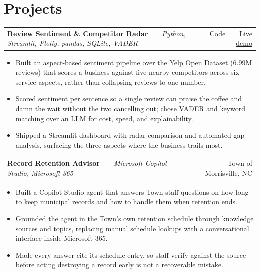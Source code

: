 \documentclass[letterpaper,10pt]{article}
\makeatletter
\newenvironment{bullets}
  {\begin{itemize}[leftmargin=1.15em,labelsep=0.45em,itemsep=1.3pt,
                   topsep=2.5pt,parsep=0pt,partopsep=0pt,label=\textbullet]}
  {\end{itemize}\vspace{1pt}}
\newcommand{\project}[3]{%
  \begin{tabularx}{\linewidth}{@{}X r@{}}
    \textbf{#1}~~\textbar{}~~\textit{\small #2} & \small #3 \\
  \end{tabularx}%
  \vspace{-3pt}
}
\makeatother
\begin{document}
\section{Projects}

\project{Review Sentiment \& Competitor Radar}
        {Python, Streamlit, Plotly, pandas, SQLite, VADER}
        {\href{https://github.com/BhargaviGudisa/review-sentiment-radar}{Code}~~\textbar{}~~\href{https://review-sentiment-radar-iyxpjovmbfqcbyeuzk3ifs.streamlit.app/}{Live demo}}
\begin{bullets}
  \item Built an aspect-based sentiment pipeline over the Yelp Open Dataset
        (6.99M reviews) that scores a business against five nearby competitors
        across six service aspects, rather than collapsing reviews to one number.
  \item Scored sentiment per sentence so a single review can praise the coffee and
        damn the wait without the two cancelling out; chose VADER and keyword
        matching over an LLM for cost, speed, and explainability.
  \item Shipped a Streamlit dashboard with radar comparison and automated gap
        analysis, surfacing the three aspects where the business trails most.
\end{bullets}

\project{Record Retention Advisor}
        {Microsoft Copilot Studio, Microsoft 365}
        {Town of Morrisville, NC}
\begin{bullets}
  \item Built a Copilot Studio agent that answers Town staff questions on how long
        to keep municipal records and how to handle them when retention ends.
  \item Grounded the agent in the Town's own retention schedule through knowledge
        sources and topics, replacing manual schedule lookups with a conversational
        interface inside Microsoft 365.
  \item Made every answer cite its schedule entry, so staff verify against the
        source before acting \textemdash{} destroying a record early is not a
        recoverable mistake.
\end{bullets}
\end{document}
